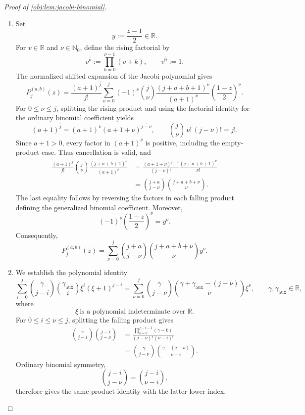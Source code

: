 \documentclass[11pt]{article}
\begin{document}
\begin{proof}[Proof of \cref{obj:lem:jacobi-binomial}]
\begin{enumerate}
\item Set
\[
y:=\frac{z-1}{2}\in\mathbb R.
\]
For \(v\in\mathbb R\) and \(\nu\in\mathbb N_0\), define the rising factorial by
\[
v^{\overline{\nu}}:=\prod_{k=0}^{\nu-1}(v+k),
\qquad v^{\overline{0}}:=1.
\]
The normalized shifted expansion of the Jacobi polynomial gives
\[
P_j^{(a,b)}(z)
=
\frac{(a+1)^{\overline j}}{j!}
\sum_{\nu=0}^{j}
(-1)^\nu\binom j\nu
\frac{(j+a+b+1)^{\overline\nu}}
     {(a+1)^{\overline\nu}}
\left(\frac{1-z}{2}\right)^\nu.
\]
For \(0\le \nu\le j\), splitting the rising product and using the factorial identity for the ordinary binomial coefficient yields
\[
(a+1)^{\overline j}
=(a+1)^{\overline\nu}
 (a+1+\nu)^{\overline{j-\nu}},
\qquad
\binom j\nu\,\nu!\,(j-\nu)!=j!.
\]
Since \(a+1>0\), every factor in \((a+1)^{\overline\nu}\) is positive, including the empty-product case. Thus cancellation is valid, and
\[
\begin{aligned}
\frac{(a+1)^{\overline j}}{j!}\binom j\nu
\frac{(j+a+b+1)^{\overline\nu}}
     {(a+1)^{\overline\nu}}
&=
\frac{(a+1+\nu)^{\overline{j-\nu}}}{(j-\nu)!}
\frac{(j+a+b+1)^{\overline\nu}}{\nu!}\\
&=\binom{j+a}{j-\nu}\binom{j+a+b+\nu}{\nu}.
\end{aligned}
\]
The last equality follows by reversing the factors in each falling product defining the generalized binomial coefficient. Moreover,
\[
(-1)^\nu\left(\frac{1-z}{2}\right)^\nu=y^\nu.
\]
Consequently,
\[
P_j^{(a,b)}(z)
=\sum_{\nu=0}^{j}
\binom{j+a}{j-\nu}\binom{j+a+b+\nu}{\nu}y^\nu.
\]

\item We establish the polynomial identity
\[
\sum_{i=0}^{j}
\binom{\gamma}{j-i}\binom{\gamma_{\mathrm{aux}}}{i}
\xi^i(\xi+1)^{j-i}
=
\sum_{\nu=0}^{j}
\binom{\gamma}{j-\nu}
\binom{\gamma+\gamma_{\mathrm{aux}}-(j-\nu)}{\nu}\xi^\nu,
\qquad
\gamma,\gamma_{\mathrm{aux}}\in\mathbb R,
\]
where
\[
\xi\ \text{is a polynomial indeterminate over }\mathbb R.
\]
For \(0\le i\le\nu\le j\), splitting the falling product gives
\[
\begin{aligned}
\binom{\gamma}{j-i}\binom{j-i}{j-\nu}
&=
\frac{\prod_{k=0}^{j-i-1}(\gamma-k)}
     {(j-\nu)!\,(\nu-i)!}\\
&=
\binom{\gamma}{j-\nu}
\binom{\gamma-(j-\nu)}{\nu-i}.
\end{aligned}
\]
Ordinary binomial symmetry,
\[
\binom{j-i}{j-\nu}=\binom{j-i}{\nu-i},
\]
therefore gives the same product identity with the latter lower index.


\end{enumerate}
\end{proof}
\end{document}
